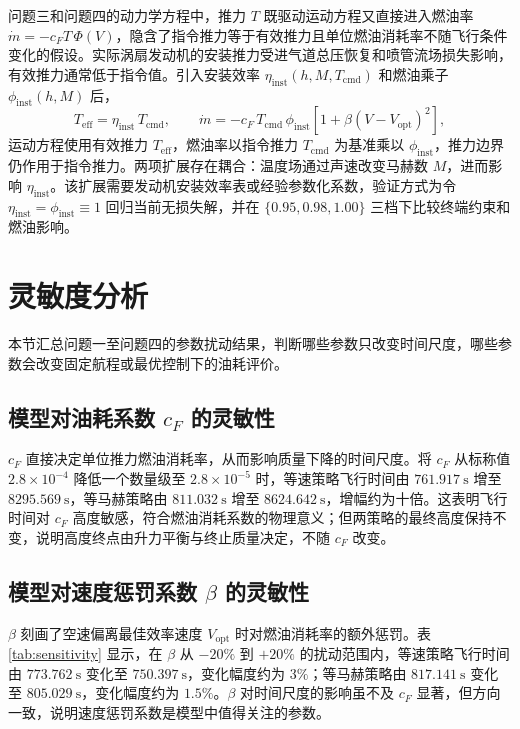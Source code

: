 \documentclass[withoutpreface,bwprint]{cumcmthesis}
\begin{document}
问题三和问题四的动力学方程中，推力 $T$ 既驱动运动方程又直接进入燃油率 $\dot m=-c_FT\,\Phi(V)$，隐含了指令推力等于有效推力且单位燃油消耗率不随飞行条件变化的假设。实际涡扇发动机的安装推力受进气道总压恢复和喷管流场损失影响，有效推力通常低于指令值。引入安装效率 $\eta_{\mathrm{inst}}(h,M,T_{\mathrm{cmd}})$ 和燃油乘子 $\phi_{\mathrm{inst}}(h,M)$ 后，
\begin{equation}
T_{\mathrm{eff}}=\eta_{\mathrm{inst}}\,T_{\mathrm{cmd}},\qquad
\dot m=-c_F\,T_{\mathrm{cmd}}\,\phi_{\mathrm{inst}}\left[1+\beta(V-V_{\mathrm{opt}})^2\right],
\label{eq:ext2_inst}
\end{equation}
运动方程使用有效推力 $T_{\mathrm{eff}}$，燃油率以指令推力 $T_{\mathrm{cmd}}$ 为基准乘以 $\phi_{\mathrm{inst}}$，推力边界仍作用于指令推力。两项扩展存在耦合：温度场通过声速改变马赫数 $M$，进而影响 $\eta_{\mathrm{inst}}$。该扩展需要发动机安装效率表或经验参数化系数，验证方式为令 $\eta_{\mathrm{inst}}=\phi_{\mathrm{inst}}\equiv1$ 回归当前无损失解，并在 $\{0.95,0.98,1.00\}$ 三档下比较终端约束和燃油影响。

\section{灵敏度分析}

本节汇总问题一至问题四的参数扰动结果，判断哪些参数只改变时间尺度，哪些参数会改变固定航程或最优控制下的油耗评价。

\subsection{模型对油耗系数 $c_F$ 的灵敏性}

$c_F$ 直接决定单位推力燃油消耗率，从而影响质量下降的时间尺度。将 $c_F$ 从标称值 $2.8\times 10^{-4}$ 降低一个数量级至 $2.8\times 10^{-5}$ 时，等速策略飞行时间由 $761.917\ \mathrm{s}$ 增至 $8295.569\ \mathrm{s}$，等马赫策略由 $811.032\ \mathrm{s}$ 增至 $8624.642\ \mathrm{s}$，增幅约为十倍。这表明飞行时间对 $c_F$ 高度敏感，符合燃油消耗系数的物理意义；但两策略的最终高度保持不变，说明高度终点由升力平衡与终止质量决定，不随 $c_F$ 改变。

\subsection{模型对速度惩罚系数 $\beta$ 的灵敏性}

$\beta$ 刻画了空速偏离最佳效率速度 $V_{\mathrm{opt}}$ 时对燃油消耗率的额外惩罚。表 \ref{tab:sensitivity} 显示，在 $\beta$ 从 $-20\%$ 到 $+20\%$ 的扰动范围内，等速策略飞行时间由 $773.762\ \mathrm{s}$ 变化至 $750.397\ \mathrm{s}$，变化幅度约为 $3\%$；等马赫策略由 $817.141\ \mathrm{s}$ 变化至 $805.029\ \mathrm{s}$，变化幅度约为 $1.5\%$。$\beta$ 对时间尺度的影响虽不及 $c_F$ 显著，但方向一致，说明速度惩罚系数是模型中值得关注的参数。
\end{document}

